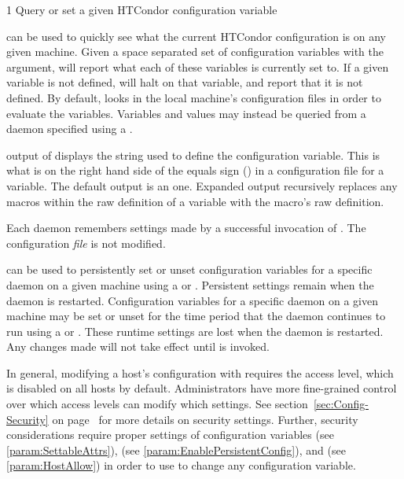 \begin{ManPage}{\label{man-condor-config-val}}{1}
{Query or set a given HTCondor configuration variable}
\Synopsis {}




\Description

 can be used to quickly see what the current
HTCondor configuration is on any given machine.  
Given a space separated set of
configuration variables with the  argument,
 will report what each of these
variables is currently set to.  If a given variable is not defined,
 will halt on that variable, and report that it is
not defined.  By default,  looks in the local
machine's configuration files in order to evaluate the variables.
Variables and values may instead be queried from a daemon specified
using a .

 output of  displays the string used to
define the configuration variable.
This is what is on the right hand side of the equals sign (\Expr{=})
in a configuration file for a variable.
The default output is an  one.
Expanded output recursively replaces any macros within the raw definition
of a variable with the macro's raw definition.

Each daemon remembers settings made by a successful invocation
of .  
The configuration \emph{file} is not modified.  

 can be used to persistently set or unset 
configuration variables for a specific daemon on a given machine
using a  or  .
Persistent settings remain when the daemon is restarted.  
Configuration variables for a specific daemon on a given machine
may be set or unset for the time period that the daemon continues to run
using a  or  .
These runtime settings are lost when the daemon is restarted.  
Any changes made will not take effect until  is invoked.

In general, modifying a host's configuration with
requires the  access level, which is disabled on all
hosts by default.
Administrators have more
fine-grained control over which access levels can modify which
settings.
See section~\ref{sec:Config-Security} on
page~\pageref{sec:Config-Security} for more details on security settings.
Further, security considerations require proper settings of
configuration variables
 (see \ref{param:SettableAttrs}),
 (see \ref{param:EnablePersistentConfig}),
and  (see \ref{param:HostAllow})
in order to use  to change any configuration variable.


\end{ManPage}

